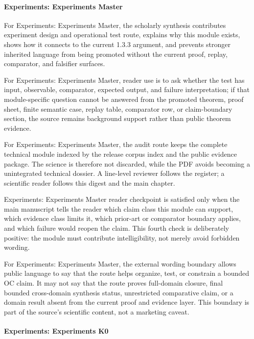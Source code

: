 \paragraph{Experiments: Experiments Master}

For Experiments: Experiments Master, the scholarly synthesis contributes experiment design and operational test route, explains why this module exists, shows how it connects to the current 1.3.3 argument, and prevents stronger inherited language from being promoted without the current proof, replay, comparator, and falsifier surfaces.


For Experiments: Experiments Master, reader use is to ask whether the test has input, observable, comparator, expected output, and failure interpretation; if that module-specific question cannot be answered from the promoted theorem, proof sheet, finite semantic case, replay table, comparator row, or claim-boundary section, the source remains background support rather than public theorem evidence.


For Experiments: Experiments Master, the audit route keeps the complete technical module indexed by the release corpus index and the public evidence package. The science is therefore not discarded, while the PDF avoids becoming a unintegrated technical dossier. A line-level reviewer follows the register; a scientific reader follows this digest and the main chapter.


Experiments: Experiments Master reader checkpoint is satisfied only when the main manuscript tells the reader which claim class this module can support, which evidence class limits it, which prior-art or comparator boundary applies, and which failure would reopen the claim. This fourth check is deliberately positive: the module must contribute intelligibility, not merely avoid forbidden wording.


For Experiments: Experiments Master, the external wording boundary allows public language to say that the route helps organize, test, or constrain a bounded OC claim. It may not say that the route proves full-domain closure, final bounded cross-domain synthesis status, unrestricted comparative claim, or a domain result absent from the current proof and evidence layer. This boundary is part of the source's scientific content, not a marketing caveat.


\paragraph{Experiments: Experiments K0}

